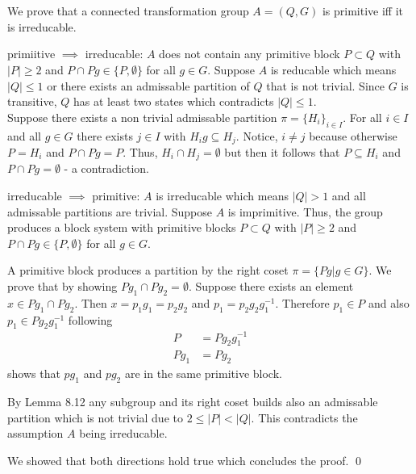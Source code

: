 \documentclass[a4paper,12pt,numbers=noenddot]{scrreport}
\begin{document}

\chapter{}
\section{}
We prove that a connected transformation group $A=(Q,G)$ is primitive iff it is irreducable.

primiitive $\implies$ irreducable: $A$ does not contain any primitive block $P \subset Q$ with $|P| \geq 2$
and $P \cap Pg \in \{P, \emptyset \}$ for all $g \in G$.
Suppose $A$ is reducable which means $|Q| \leq 1$ or there exists an admissable partition of $Q$ that is not trivial.
Since $G$ is transitive, $Q$ has at least two states which contradicts $|Q| \leq 1$.\\
Suppose there exists a non trivial admissable partition $\pi = \{H_i\}_{i \in I}$.
For all $i \in I$ and all $g \in G$ there exists $j \in I$ with $H_ig \subseteq H_j$.
Notice, $i \neq j$ because otherwise $P = H_i$ and $P \cap Pg = P$.
Thus, $H_i \cap H_j = \emptyset$ but then it follows that $P \subseteq H_i$ and $P \cap Pg = \emptyset$ - a contradiction.

irreducable $\implies$ primitive: $A$ is irreducable which means $|Q| > 1$ and all admissable partitions are trivial.
Suppose $A$ is imprimitive.
Thus, the group produces a block system with primitive blocks $P \subset Q$ with $|P| \geq 2$ and $P \cap Pg \in \{P, \emptyset\}$ for all $g \in G$.

A primitive block produces a partition by the right coset  $\pi = \{Pg | g \in G\}$.
We prove that by showing $Pg_1 \cap Pg_2 = \emptyset$.
Suppose there exists an element $x \in Pg_1 \cap Pg_2$.
Then $x = p_1g_1 = p_2g_2$ and $p_1 = p_2g_2g^{-1}_1$. 
Therefore $p_1 \in P$ and also $p_1 \in Pg_2g^{-1}_1$ following 
\begin{align*}
    P &= Pg_2g^{-1}_1\\
    Pg_1 &= Pg_2
\end{align*}
shows that $pg_1$ and $pg_2$ are in the same primitive block.

By Lemma 8.12 any subgroup and its right coset builds also an admissable partition which is not trivial due to $2 \leq |P| < |Q|$.
This contradicts the assumption $A$ being irreducable.

We showed that both directions hold true which concludes the proof.
\qed
\end{document}
